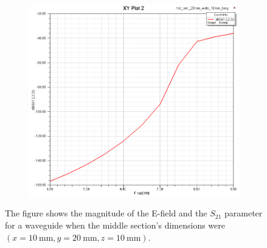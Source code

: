 \documentclass[12pt,a4paper]{article}
\begin{document}
\begin{figure}
\begin{subfigure}[b]{0.49\textwidth}
    \label{fig:2_2010_9ghz}
  \end{subfigure}
  \begin{subfigure}[b]{0.49\textwidth}
    \includegraphics[width=\textwidth]{./mid_sec_20mm_wide_10mm_long/s1222.png}
    \label{fig:2_2010_s1222}
  \end{subfigure}
  \caption{The figure shows the magnitude of the E-field and the $S_{21}$ parameter for a waveguide when the middle section's dimensions were $(x=\SI{10}{\milli\metre}, y=\SI{20}{\milli\metre}, z=\SI{10}{\milli\metre})$.}
  \label{fig:task2_2010}
\end{figure}
\end{document}

